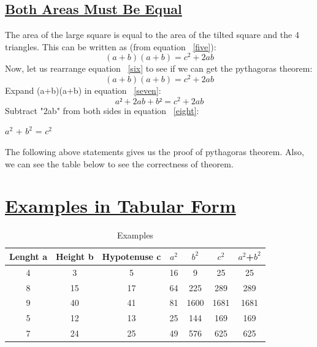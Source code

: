 \documentclass[10pt]{article}
\begin{document}
\subsection{\underline{Both Areas Must Be Equal}}
\label{a_equal}

The area of the large square is equal to the area of the tilted square and the 4 triangles. This can be written as (from equation ~\ref{five}):\newline
\begin{equation}
\label{six}
(a+b)(a+b) = c^2 +2ab
\end{equation}
Now, let us rearrange equation ~\ref{six} to see if we can get the pythagoras theorem:
\begin{equation}
\label{seven}
(a+b)(a+b)	=	c^2 + 2ab
\end{equation}
Expand (a+b)(a+b) in equation ~\ref{seven}:
\begin{equation}
\label{eight}
a² + 2ab + b²	=	c^2 + 2ab
\end{equation}
Subtract "2ab" from both sides in equation ~\ref{eight}:\newline	 
\centerline {$a^2$ + $b^2$	=	$c^2$}\newline

The following above statements gives us the proof of 
pythagoras theorem. Also, we can see the table below to see the correctness of theorem.

\section{\underline{Examples in Tabular Form}}
\begin{table}[bht]%
	\begin{center}
		\begin{tabular}{c c c c c c c}
			\hline\hline
			Lenght a & Height b & Hypotenuse c & $a^2$ & $b^2$ & $c^2$ & $a^2$+$b^2$    \\
			\hline
			\hline
			4 & 3 & 5 & 16 & 9 & 25 & 25 \\
			8 & 15 & 17 & 64 & 225 & 289 & 289\\
			9 & 40 & 41 & 81 & 1600 & 1681 & 1681\\
			5 & 12 & 13 & 25 & 144 & 169 & 169 \\
			7 & 24 & 25 & 49 & 576 & 625 & 625\\
			\hline
		\end{tabular}
		\caption{Examples}
		\label{sec:examp}
	\end{center}
\end{table}
\clearpage
\nocite{*}


\end{document}
